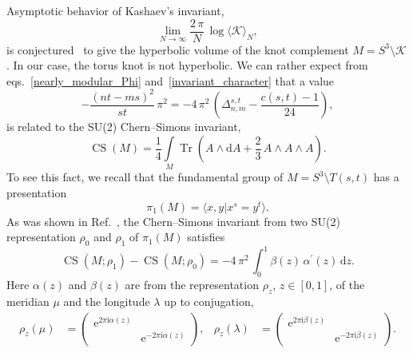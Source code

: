 \documentclass[12pt,reqno]{amsart}
\DeclareMathOperator{\Tr}{Tr}
\DeclareMathOperator{\CS}{CS}
\begin{document}
Asymptotic behavior of Kashaev's invariant,
\begin{equation*}
  \lim_{N\to \infty} \frac{2 \, \pi}{N} \,
  \log
  \langle \mathcal{K} \rangle_N ,
\end{equation*}
is conjectured~\cite{Kasha96b,MuraMura99a}
to give the
hyperbolic volume of the knot complement
$M= S^3 \setminus \mathcal{K}$.
In our case, the torus knot is not hyperbolic.
We can rather  expect
from  eqs.~\eqref{nearly_modular_Phi} and~\eqref{invariant_character} that
a value
\begin{equation}
  \label{log_limit_T}
  -\frac{(n  t - m  s)^2}{ s t} \, \pi^2 
  =
  - 4 \, \pi^2 \,
  \left(
    \Delta_{n,m}^{s,t} - \frac{c(s,t)-1}{24}
  \right) ,
\end{equation}
is related to the SU(2)
Chern--Simons invariant,
\begin{equation*}
  \CS(M)
  =
  \frac{1}{4} \int\limits_{M} \Tr
  \left(
    A \land \mathrm{d} A +
    \frac{2}{3} \, A \land A \land A
  \right) .
\end{equation*}
To see this fact,
we recall that
the fundamental group of $M=S^3 \setminus T(s,t)$ has a presentation
\begin{equation}
  \label{group_torus}
  \pi_1(M)
  =
  \langle x , y | x^s = y^t \rangle .
\end{equation}
As was shown in  Ref.~,
the Chern--Simons invariant from 
two  SU(2) representation $\rho_0$ and
$\rho_1$ of $\pi_1(M)$ satisfies
\begin{equation}
  \label{CS_difference}
  \CS(M ; \rho_1)
  - \CS(M ; \rho_0)
  =
  - 4 \, \pi^2 \,
  \int_0^1 \beta(z) \, \alpha^\prime(z) \,
  \mathrm{d} z .
\end{equation}
Here  $\alpha(z)$ and $\beta(z)$ are from the representation
$\rho_z$, $z \in [0,1]$,
of the
meridian $\mu$ and the longitude $\lambda$ up to conjugation,
\begin{align*}
  \rho_z(\mu)
  & =
  \begin{pmatrix}
    \mathrm{e}^{2 \pi \mathrm{i} \alpha(z)} &
    \\
    & \mathrm{e}^{-2 \pi \mathrm{i} \alpha(z)} 
  \end{pmatrix},
%
  &
%
  \rho_z(\lambda)
  & =
  \begin{pmatrix}
    \mathrm{e}^{2 \pi \mathrm{i} \beta(z)} &
    \\
    & \mathrm{e}^{-2 \pi \mathrm{i} \beta(z)} 
  \end{pmatrix} .
\end{align*}
\end{document}
